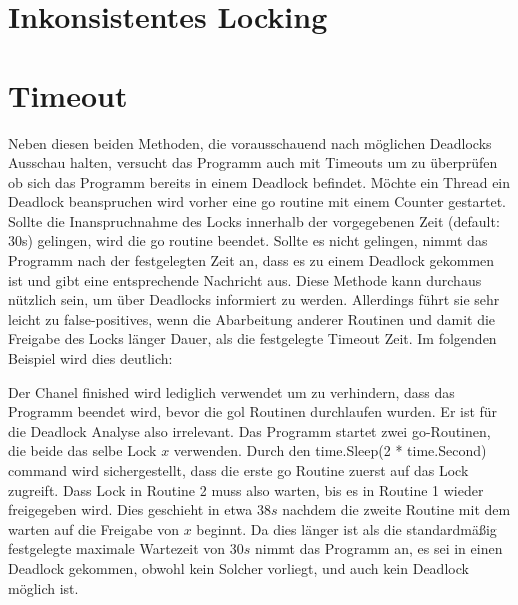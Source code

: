 \section{Inkonsistentes Locking}

\section{Timeout}
Neben diesen beiden Methoden, die vorausschauend nach möglichen Deadlocks 
Ausschau halten, versucht das Programm auch mit Timeouts um zu überprüfen ob 
sich das Programm bereits in einem Deadlock befindet. Möchte ein Thread ein 
Deadlock beanspruchen wird vorher eine go routine mit einem Counter gestartet.
Sollte die Inanspruchnahme des Locks innerhalb der vorgegebenen Zeit 
(default: 30s) gelingen, wird die go routine beendet. Sollte es nicht gelingen,
nimmt das Programm nach der festgelegten Zeit an, dass es zu einem Deadlock 
gekommen ist und gibt eine entsprechende Nachricht aus. Diese Methode kann
durchaus nützlich sein, um über Deadlocks informiert zu werden. Allerdings führt
sie sehr leicht zu false-positives, wenn die Abarbeitung anderer Routinen und 
damit die Freigabe des Locks länger Dauer, als die festgelegte Timeout Zeit.
Im folgenden Beispiel wird dies deutlich:
\begin{figure}[H]
    
\end{figure}
Der Chanel finished wird lediglich verwendet um zu verhindern, dass das Programm 
beendet wird, bevor die gol Routinen durchlaufen wurden. Er ist für die Deadlock
Analyse also irrelevant. Das Programm startet zwei go-Routinen, die beide das 
selbe Lock $x$ verwenden. Durch den time.Sleep(2 * time.Second) command wird 
sichergestellt, dass die erste go Routine zuerst auf das Lock zugreift. 
Dass Lock in Routine 2 muss also warten, bis es in Routine 1 wieder freigegeben
wird. Dies geschieht in etwa $38 s$ nachdem die zweite Routine mit dem warten 
auf die Freigabe von $x$ beginnt. Da dies länger ist als die standardmäßig
festgelegte maximale Wartezeit von $30 s$ nimmt das Programm an, es sei in einen 
Deadlock gekommen, obwohl kein Solcher vorliegt, und auch kein Deadlock möglich 
ist.

